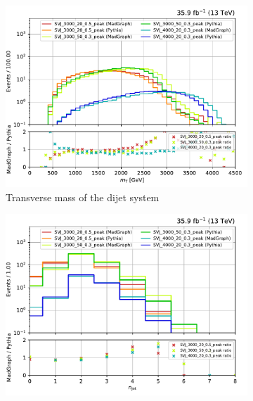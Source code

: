 \clearpage

\begin{figure}[htbp]
    \centering
    \begin{subfigure}[b]{0.48\textwidth}
        \includegraphics[width=\textwidth]{figures/madgraph_pythia_comparisons/plots/part2/dijet_mt.pdf}
        \caption{Transverse mass of the dijet system}
    \end{subfigure}
    \hfill
    \begin{subfigure}[b]{0.48\textwidth}
        \includegraphics[width=\textwidth]{figures/madgraph_pythia_comparisons/plots/part2/njet.pdf}
        \caption{\njet}
    \end{subfigure}


\end{figure}
